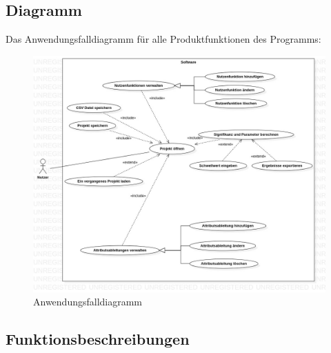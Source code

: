 \documentclass{article}
\begin{document}
\subsection{Diagramm}
Das Anwendungsfalldiagramm für alle Produktfunktionen des Programms:
\begin{figure}[H]%
  \centering
  \includegraphics[width=15cm]{specifications/img/use-case/UseCaseDiagram6.jpg}
  \caption{Anwendungsfalldiagramm}
\end{figure} 
\newpage
{}

\subsection{Funktionsbeschreibungen}
\end{document}
